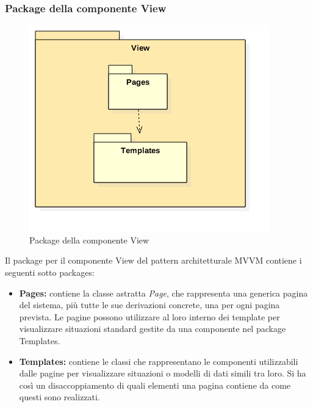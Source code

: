 \subsubsection{Package della componente View}
	\begin{figure}[h!]
	\begin{center}
		\includegraphics[scale=0.6]{../images/ViewPackage.png}
		\caption{Package della componente View}
	\end{center}
	\end{figure}
	Il package per il componente View del pattern architetturale MVVM contiene i seguenti sotto packages:
	\begin{itemize}
		\item\textbf{Pages:} contiene la classe astratta \textit{Page}, che rappresenta una generica pagina del sistema, più tutte le sue derivazioni concrete, una per ogni pagina prevista. Le pagine possono utilizzare al loro interno dei template per visualizzare situazioni standard gestite da una componente nel package Templates.
		\item\textbf{Templates:} contiene le classi che rappresentano le componenti utilizzabili dalle pagine per visualizzare situazioni o modelli di dati simili tra loro. Si ha così un disaccoppiamento di quali elementi una pagina contiene da come questi sono realizzati.\\
\\
\end{itemize}	
\newpage